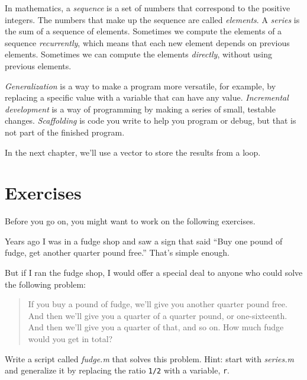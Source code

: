 In mathematics, a \emph{sequence} is a set of numbers that correspond
to the positive integers.
The numbers that make up the sequence are called \mbox{\emph{elements}}.
A \emph{series} is the sum of a sequence of elements.
Sometimes we compute the elements of a sequence \emph{recurrently}, which means that each new element depends on previous elements.  Sometimes we can compute the elements \emph{directly}, without using previous elements.

\emph{Generalization} is a way to make a program more versatile, for example, by replacing a specific value with a variable that can have any value.
\emph{Incremental development} is a way of programming by making a series of small, testable changes.
\emph{Scaffolding} is code you write to help you program or debug, but
that is not part of the finished program.

In the next chapter, we'll use a vector to store the results from a loop.


\section{Exercises}

Before you go on, you might want to work on the following exercises.

\begin{ex}
Years ago I was in a fudge shop and saw a sign that said ``Buy one pound of fudge, get another quarter pound free.''  That's simple enough.

But if I ran the fudge shop, I would offer a special deal to anyone who could solve the following problem:

\begin{quote}
If you buy a pound of fudge, we'll give you another quarter pound free.  And then we'll give you a quarter of a quarter pound, or one-sixteenth.  And then we'll give you a quarter of that, and so on.  How much fudge would you get in total?
\end{quote}

Write a script called \emph{fudge.m} that solves this problem.  Hint: start with \emph{series.m} and generalize it by replacing the ratio \lstinline{1/2} with a variable, \lstinline{r}.

\end{ex}




